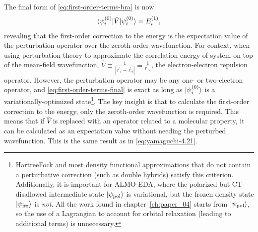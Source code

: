 \documentclass[%
class = book,%
crop = false,%
float = true,%
multi = true,%
preview = false,%
]{standalone}
\newcommand\hf{Hartree\textendash{}Fock}
\begin{document}
The final form of \eqref{eq:first-order-terms-bra} is now
\begin{equation}
  \label{eq:first-order-terms-final}
  \braket{\psi_{i}^{(0)} | \hat{V} | \psi_{i}^{(0)}} = E_{i}^{(1)},
\end{equation}
revealing that the first-order correction to the energy is the expectation value of the perturbation operator over the zeroth-order wavefunction. For context, when using perturbation theory to approximate the correlation energy of system on top of the mean-field wavefunction, \(\hat{V} \equiv \frac{1}{|\vec{r}_{1} - \vec{r}_{2}|} = \frac{1}{r_{12}}\), the electron-electron repulsion operator. However, the perturbation operator may be any one- or two-electron operator, and \eqref{eq:first-order-terms-final} is exact as long as \(\ket{\psi_{i}^{(0)}}\) is a variationally-optimized state\footnote{\hf{} and most density functional approximations that do not contain a perturbative correction (such as double hybrids) satisfy this criterion. Additionally, it is important for ALMO-EDA, where the polarized but CT-disallowed intermediate state \(\ket{\psi_{\text{pol}}}\) is variational, but the frozen density state \(\ket{\psi_{\text{frz}}}\) is \emph{not}. All the work found in chapter~\ref{ch:paper_04} starts from \(\ket{\psi_{\text{pol}}}\), so the use of a Lagrangian to account for orbital relaxation (leading to additional terms) is unnecessary.}. The key insight is that to calculate the first-order correction to the energy, only the zeroth-order wavefunction is required. This means that if \(\hat{V}\) is replaced with an operator related to a molecular property, it can be calculated as an expectation value without needing the perturbed wavefunction. This is the same result as in \eqref{eq:yamaguchi-4.21}.
\end{document}
